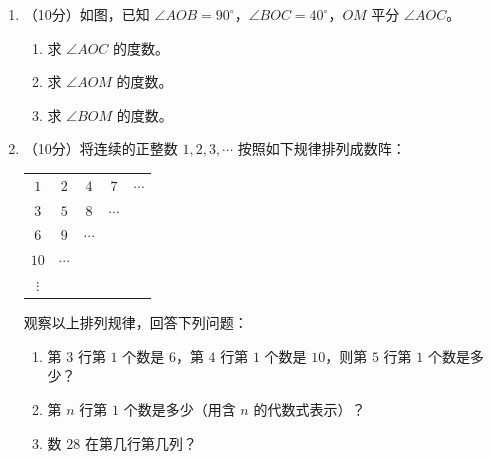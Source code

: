 \documentclass[12pt, a4paper]{ctexart}
\begin{document}
\begin{enumerate}[label=\textbf{\arabic*.}, leftmargin=2.5em, resume]
\item （10分）如图，已知 $\angle AOB = 90^{\circ}$，$\angle BOC = 40^{\circ}$，$OM$ 平分 $\angle AOC$。
\begin{enumerate}[label=(\arabic*), nosep]
\item 求 $\angle AOC$ 的度数。
\item 求 $\angle AOM$ 的度数。
\item 求 $\angle BOM$ 的度数。
\end{enumerate}
\vspace{6cm}

\item （10分）将连续的正整数 $1, 2, 3, \cdots$ 按照如下规律排列成数阵：
\begin{center}
\begin{tabular}{ccccc}
$1$ & $2$ & $4$ & $7$ & $\cdots$ \\
$3$ & $5$ & $8$ & $\cdots$ & \\
$6$ & $9$ & $\cdots$ & & \\
$10$ & $\cdots$ & & & \\
$\vdots$ & & & &
\end{tabular}
\end{center}
观察以上排列规律，回答下列问题：
\begin{enumerate}[label=(\arabic*), nosep]
\item 第 $3$ 行第 $1$ 个数是 $6$，第 $4$ 行第 $1$ 个数是 $10$，则第 $5$ 行第 $1$ 个数是多少？
\item 第 $n$ 行第 $1$ 个数是多少（用含 $n$ 的代数式表示）？
\item 数 $28$ 在第几行第几列？
\end{enumerate}
\vspace{6cm}

\end{enumerate}
\end{document}
